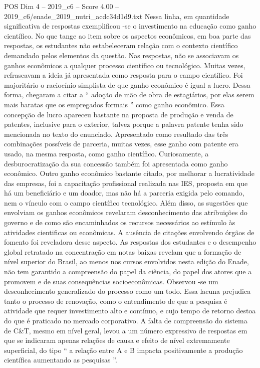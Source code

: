 \begin{textsample}{POS Dim 4 – 2019\_c6 – Score 4.00 – 2019\_c6/enade\_2019\_nutri\_acdc34d1d9.txt}
Nessa linha, em quantidade significativa de respostas exemplificou -se o investimento na educação como ganho científico.
No que tange ao item sobre os aspectos econômicos, em boa parte das respostas, os estudantes não estabeleceram relação com o contexto científico demandado pelos elementos da questão.
Nas respostas, não se associavam os ganhos econômicos a qualquer processo científico ou tecnológico.
Muitas vezes, refraseavam a ideia já apresentada como resposta para o campo científico.
Foi majoritário o raciocínio simplista de que ganho econômico é igual a lucro.
Dessa forma, chegaram a citar a “ adoção de mão de obra de estagiários, por elas serem mais baratas que os empregados formais ” como ganho econômico.
Essa concepção de lucro apareceu bastante na proposta de produção e venda de patentes, inclusive para o exterior, talvez porque a palavra patente tenha sido mencionada no texto do enunciado.
Apresentado como resultado das três combinações possíveis de parceria, muitas vezes, esse ganho com patente era usado, na mesma resposta, como ganho científico.
Curiosamente, a desburocratização da sua concessão também foi apresentada como ganho econômico.
Outro ganho econômico bastante citado, por melhorar a lucratividade das empresas, foi a capacitação profissional realizada nas IES, proposta em que há um beneficiário e um doador, mas não há a parceria exigida pelo comando, nem o vínculo com o campo científico tecnológico.
Além disso, as sugestões que envolviam os ganhos econômicos revelaram desconhecimento das atribuições do governo e de como são encaminhados os recursos necessários ao estímulo às atividades cientificas ou econômicas.
A ausência de citações envolvendo órgãos de fomento foi reveladora desse aspecto.
As respostas dos estudantes e o desempenho global retratado na concentração em notas baixas revelam que a formação de nível superior do Brasil, ao menos nos cursos envolvidos nesta edição do Enade, não tem garantido a compreensão do papel da ciência, do papel dos atores que a promovem e de suas consequências socioeconômicas.
Observou -se um desconhecimento generalizado do processo como um todo.
Essa lacuna prejudica tanto o processo de renovação, como o entendimento de que a pesquisa é atividade que requer investimento alto e contínuo, e cujo tempo de retorno destoa do que é praticado no mercado corporativo.
A falta de compreensão do sistema de C\&T, mesmo em nível geral, levou a um número expressivo de respostas em que se indicaram apenas relações de causa e efeito de nível extremamente superficial, do tipo “ a relação entre A e B impacta positivamente a produção científica aumentando as pesquisas ”.

\end{textsample}
